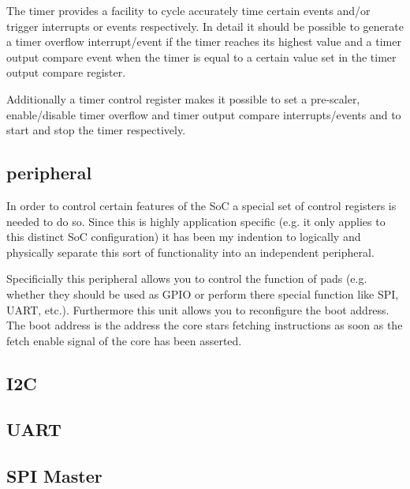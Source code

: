 The timer provides a facility to cycle accurately time certain events and/or trigger interrupts or events respectively. In detail it should be possible to generate a timer overflow interrupt/event if the timer reaches its highest value and a timer output compare event when the timer is equal to a certain value set in the timer output compare register.


Additionally a timer control register makes it possible to set a pre-scaler, enable/disable timer overflow and timer output compare interrupts/events and to start and stop the timer respectively.

\subsection{\pulpino peripheral}

In order to control certain features of the SoC a special set of control registers is needed to do so. Since this is highly application specific (e.g. it only applies to this distinct SoC configuration) it has been my indention to logically and physically separate this sort of functionality into an independent peripheral.

Specificially this peripheral allows you to control the function of pads (e.g. whether they should be used as GPIO or perform there special function like SPI, UART, etc.). Furthermore this unit allows you to reconfigure the boot address. The boot address is the address the core stars fetching instructions as soon as the fetch enable signal of the core has been asserted.

\subsection{I2C}

\subsection{UART}

\subsection{SPI Master}








